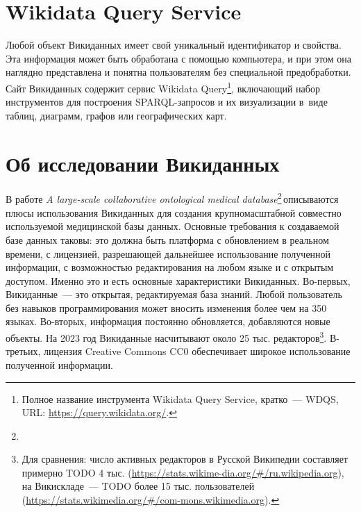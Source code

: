 \section{Wikidata Query Service}
\label{sect:WDQS}

Любой объект Викиданных имеет свой уникальный идентификатор и свойства. 
Эта информация может быть обработана с помощью компьютера, 
и при этом она наглядно представлена и понятна пользователям без специальной предобработки. 
Сайт Викиданных содержит сервис Wikidata Query\footnote{%
%
Полное название инструмента Wikidata Query Service, кратко~--- WDQS, URL: 
\href{https://query.wikidata.org/}{https://query.wikidata.org/}.%
%
}, включающий набор инструментов для построения SPARQL-запросов 
и их визуализации в~виде таблиц, диаграмм, графов или географических карт.




\section{Об исследовании Викиданных}

В работе \textit{A large-scale collaborative ontological medical database}\footnote{%
}\,описываются плюсы использования Викиданных для создания крупномасштабной 
совместно используемой медицинской базы данных. 
Основные требования к создаваемой базе данных таковы: 
это должна быть платформа с обновлением в реальном времени, 
с лицензией, разрешающей дальнейшее использование полученной информации, 
с возможностью редактирования на любом языке и с открытым доступом. 
Именно это и есть основные характеристики Викиданных. 
Во-первых, Викиданные~--- это открытая, редактируемая база знаний. 
Любой пользователь без навыков программирования может вносить изменения 
более чем на 350 языках. 
Во-вторых, информация постоянно обновляется, добавляются новые объекты. 
На 2023 год Викиданные насчитывают около 25 тыс. редакторов\footnote{Для сравнения: 
число активных редакторов в Русской Википедии 
составляет примерно TODO 4 тыс.  
(\href{https://stats.wikimedia.org/\#/ru.wikipedia.org}{https://stats.wikime-dia.org/\#/ru.wikipedia.org}), 
на Викискладе~--- TODO более 15 тыс. пользователей 
(\href{https://stats.wikimedia.org/\#/commons.wikimedia.org}{https://stats.wikimedia.org/\#/com-mons.wikimedia.org}).}.
В-третьих, лицензия Creative Commons CC0 обеспечивает широкое использование полученной информации. 

